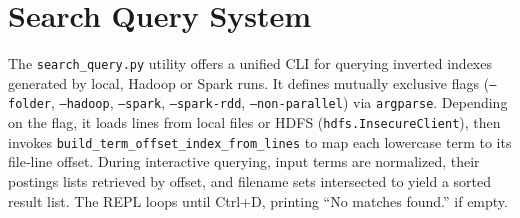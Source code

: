 \section{Search Query System}
The \texttt{search\_query.py} utility offers a unified CLI for querying inverted indexes generated by local, Hadoop or Spark runs. It defines mutually exclusive flags (\texttt{--folder}, \texttt{--hadoop}, \texttt{--spark}, \texttt{--spark‑rdd}, \texttt{--non‑parallel}) via \texttt{argparse}. Depending on the flag, it loads lines from local files or HDFS (\texttt{hdfs.InsecureClient}), then invokes \texttt{build\_term\_offset\_index\_from\_lines} to map each lowercase term to its file‑line offset. During interactive querying, input terms are normalized, their postings lists retrieved by offset, and filename sets intersected to yield a sorted result list. The REPL loops until Ctrl+D, printing “No matches found.” if empty.  
